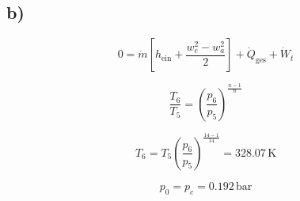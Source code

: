 

\subsection*{b)}

\[
0 = \dot{m} \left[ h_{\text{ein}} + \frac{w_e^2 - w_a^2}{2} \right] + \dot{Q}_{\text{ges}} + \dot{W}_t
\]

\[
\frac{T_6}{T_5} = \left( \frac{p_6}{p_5} \right)^{\frac{n-1}{n}}
\]

\[
T_6 = T_5 \left( \frac{p_6}{p_5} \right)^{\frac{14-1}{14}} = 328.07 \, \text{K}
\]

\[
p_0 = p_c = 0.192 \, \text{bar}
\]